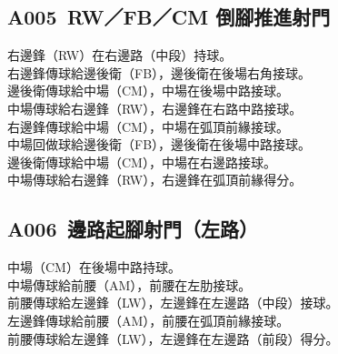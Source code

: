 \documentclass[10pt]{article}
\begin{document}
\subsection*{A005\, RW／FB／CM 倒腳推進射門}
\noindent 右邊鋒（RW）在右邊路（中段）持球。\\
右邊鋒傳球給邊後衛（FB），邊後衛在後場右角接球。\\
邊後衛傳球給中場（CM），中場在後場中路接球。\\
中場傳球給右邊鋒（RW），右邊鋒在右路中路接球。\\
右邊鋒傳球給中場（CM），中場在弧頂前緣接球。\\
中場回做球給邊後衛（FB），邊後衛在後場中路接球。\\
邊後衛傳球給中場（CM），中場在右邊路接球。\\
中場傳球給右邊鋒（RW），右邊鋒在弧頂前緣得分。
\vspace{0.5em}

\subsection*{A006\, 邊路起腳射門（左路）}
\noindent 中場（CM）在後場中路持球。\\
中場傳球給前腰（AM），前腰在左肋接球。\\
前腰傳球給左邊鋒（LW），左邊鋒在左邊路（中段）接球。\\
左邊鋒傳球給前腰（AM），前腰在弧頂前緣接球。\\
前腰傳球給左邊鋒（LW），左邊鋒在左邊路（前段）得分。
\vspace{0.5em}
\end{document}
